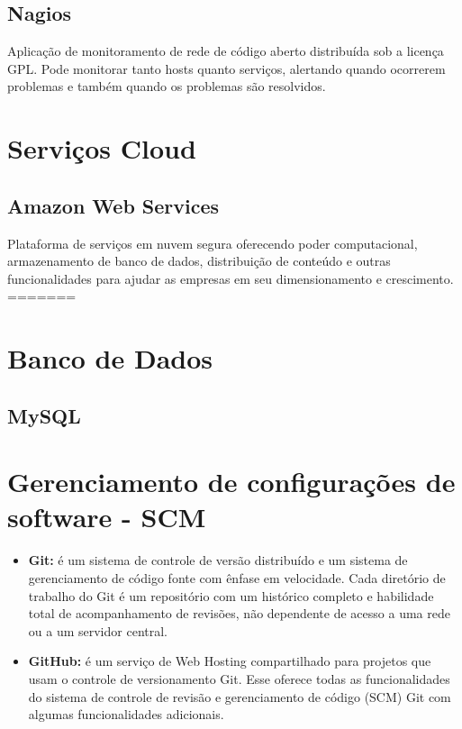 	\subsection{Nagios} Aplicação de monitoramento de rede de código 
	aberto distribuída sob a licença GPL. Pode monitorar tanto hosts 
	quanto serviços, alertando quando ocorrerem problemas e também 
	quando os problemas são resolvidos.

    \section{Serviços Cloud}

	\subsection{Amazon Web Services} Plataforma de serviços em nuvem 
	segura oferecendo poder computacional, armazenamento de banco de 
	dados, distribuição de conteúdo e outras funcionalidades para 
	ajudar as empresas em seu dimensionamento e crescimento.
=======
\section{Banco de Dados}

\subsection{MySQL}


\section{Gerenciamento de configurações de software - SCM}

\begin{itemize}

\item \textbf{Git:} é um sistema de controle de versão distribuído e um sistema de gerenciamento de código fonte com ênfase em velocidade. Cada diretório de trabalho do Git é um repositório com um histórico completo e habilidade total de acompanhamento de revisões, não dependente de acesso a uma rede ou a um servidor central.

\item \textbf{GitHub:} é um serviço de Web Hosting compartilhado para projetos que usam o controle de versionamento Git. Esse oferece todas as funcionalidades do sistema de controle de revisão e gerenciamento de código (SCM) Git com algumas funcionalidades adicionais.


\end{itemize}

